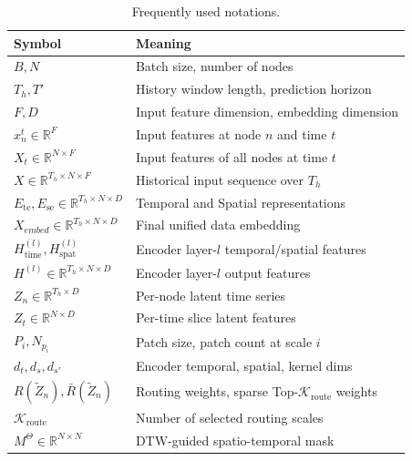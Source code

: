 \documentclass[5p,times,authoryear]{elsarticle}
\begin{document}
\begin{table}[!t]
\centering
\caption{Frequently used notations.}
\label{tab:nota_desc}
\footnotesize
\setlength{\tabcolsep}{6pt}
\renewcommand{\arraystretch}{1.05}
\begin{tabular}{@{}l l@{}}
\toprule
    \textbf{Symbol} & \textbf{Meaning} \\
\midrule
$B, N$ & Batch size, number of nodes \\
$T_h, T'$ & History window length, prediction horizon \\
$F, D$ & Input feature dimension, embedding dimension \\
$x_n^t \in \mathbb{R}^F$ & Input features at node $n$ and time $t$ \\
$X_t \in \mathbb{R}^{N \times F}$ & Input features of all nodes at time $t$ \\
$X \in \mathbb{R}^{T_h \times N \times F}$ & Historical input sequence over $T_h$ \\
$E_{\text{te}}, E_{\text{se}} \in \mathbb{R}^{T_h \times N \times D}$ & Temporal and Spatial representations \\
$X_{embed} \in \mathbb{R}^{T_h \times N \times D}$ & Final unified data embedding \\ %
$H_{\text{time}}^{(l)}, H_{\text{spat}}^{(l)}$ & Encoder layer-$l$ temporal/spatial features \\
$H^{(l)} \in \mathbb{R}^{T_h \times N \times D}$ & Encoder layer-$l$ output features \\
$Z_n \in \mathbb{R}^{T_h \times D}$ & Per-node latent time series \\
$Z_t \in \mathbb{R}^{N \times D}$ & Per-time slice latent features \\ %
$P_i, N_{p_i}$ & Patch size, patch count at scale $i$ \\
$d_t, d_s, d_{s'}$ & Encoder temporal, spatial, kernel dims \\
$R(\tilde{Z}_n), \bar{R}(\tilde{Z}_n)$ & Routing weights, sparse Top-$\mathcal{K}_{\text{route}}$ weights \\
$\mathcal{K}_{\text{route}}$ & Number of selected routing scales \\
$M^{\Theta} \in \mathbb{R}^{N \times N}$ & DTW-guided spatio-temporal mask \\
\bottomrule
\end{tabular}
\end{table}

\end{document}
